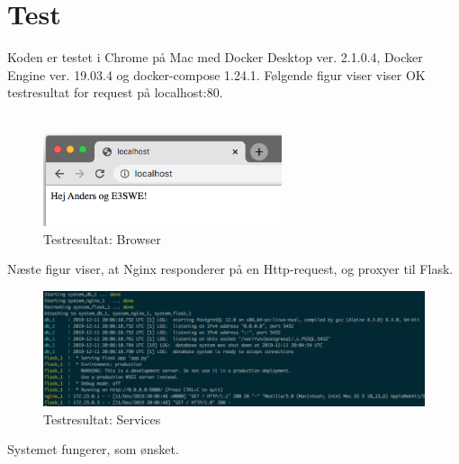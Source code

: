 \documentclass[a4paper]{article}
\begin{document}
\section{Test}
Koden er testet i Chrome på Mac med Docker Desktop ver. 2.1.0.4, Docker Engine ver. 19.03.4 og docker-compose 1.24.1.
Følgende figur viser viser OK testresultat for request på localhost:80.
\\\\
\begin{figure}[H]
\centering
\includegraphics[width=7cm]{../img/test.png}
\caption{Testresultat: Browser\label{fig:test}}
\end{figure}

\begin{par}
Næste figur viser, at Nginx responderer på en Http-request, og proxyer til Flask.
\end{par}

\begin{figure}[H]
\centering
\includegraphics[width=16cm]{../img/test2.png}
\caption{Testresultat: Services\label{fig:test2}}
\end{figure}

\begin{par}
Systemet fungerer, som ønsket.
\end{par}
\end{document}
